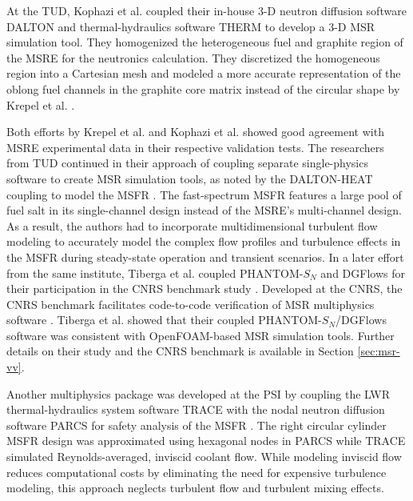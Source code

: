 At the \gls{TUD}, Kophazi et al.
\cite{kophazi_development_2009} coupled their in-house 3-D neutron diffusion software DALTON
\cite{boer_validation_2010} and thermal-hydraulics
software THERM to develop a 3-D \gls{MSR} simulation tool. They homogenized the heterogeneous fuel
and graphite region of the \gls{MSRE} for the neutronics calculation. They discretized the
homogeneous region into a Cartesian mesh and modeled a more accurate representation of the oblong
fuel channels in the graphite core matrix instead of the circular shape by Krepel et al.
\cite{krepel_dyn3d-msr_2007}.

Both efforts by Krepel et al. and Kophazi et al. showed good
agreement with \gls{MSRE} experimental data in their respective validation tests.
The researchers from \gls{TUD} continued in their approach of coupling separate single-physics
software to create \gls{MSR} simulation tools, as noted by the DALTON-HEAT
\cite{de_zwaan_static_2007} coupling to model the \gls{MSFR} \cite{fiorina_modelling_2014}. The
fast-spectrum \gls{MSFR} features a large pool of fuel salt in its single-channel design instead of
the \gls{MSRE}'s multi-channel design. As a result, the authors had to incorporate
multidimensional turbulent flow modeling to accurately model the complex flow profiles and
turbulence effects in the \gls{MSFR} during steady-state operation and transient scenarios. In a
later effort from the same institute, Tiberga et al. \cite{tiberga_discontinuous_2019} coupled
PHANTOM-$S_N$ and DGFlows for their participation in the CNRS benchmark study
\cite{tiberga_results_2020}. Developed at the \gls{CNRS}, the CNRS benchmark facilitates
code-to-code verification of \gls{MSR} multiphysics software \cite{aufiero_testing_2018}. Tiberga
et al. showed that their coupled PHANTOM-$S_N$/DGFlows software was consistent with
OpenFOAM-based \gls{MSR} simulation tools. Further details on their study and the CNRS benchmark
is available in Section \ref{sec:msr-vv}.

Another multiphysics package was developed at the \gls{PSI} by coupling the \gls{LWR}
thermal-hydraulics system software \gls{TRACE} \cite{nrc_trace_2007}
with the nodal neutron diffusion software \gls{PARCS} \cite{downar_parcs_2010} for safety
analysis of the \gls{MSFR} \cite{pettersen_coupled_2016}. The right circular cylinder \gls{MSFR}
design was approximated using hexagonal nodes in \gls{PARCS} while \gls{TRACE} simulated
Reynolds-averaged, inviscid coolant flow. While modeling inviscid flow reduces computational costs
by eliminating the need for expensive turbulence modeling, this approach neglects turbulent flow
and turbulent mixing effects.

